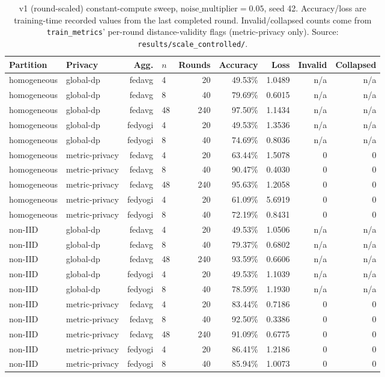 \documentclass[11pt]{article}
\newcommand{\code}[1]{\texttt{#1}}
\begin{document}
\begin{table}[h]
\centering
\footnotesize
\begin{tabular}{llrlrrrrr}
\toprule
Partition & Privacy & Agg. & $n$ & Rounds & Accuracy & Loss & Invalid & Collapsed \\
\midrule
homogeneous & global-dp      & fedavg  & 4  & 20  & 49.53\% & 1.0489 & n/a & n/a \\
homogeneous & global-dp      & fedavg  & 8  & 40  & 79.69\% & 0.6015 & n/a & n/a \\
homogeneous & global-dp      & fedavg  & 48 & 240 & 97.50\% & 1.1434 & n/a & n/a \\
homogeneous & global-dp      & fedyogi & 4  & 20  & 49.53\% & 1.3536 & n/a & n/a \\
homogeneous & global-dp      & fedyogi & 8  & 40  & 74.69\% & 0.8036 & n/a & n/a \\
homogeneous & metric-privacy & fedavg  & 4  & 20  & 63.44\% & 1.5078 & 0 & 0 \\
homogeneous & metric-privacy & fedavg  & 8  & 40  & 90.47\% & 0.4030 & 0 & 0 \\
homogeneous & metric-privacy & fedavg  & 48 & 240 & 95.63\% & 1.2058 & 0 & 0 \\
homogeneous & metric-privacy & fedyogi & 4  & 20  & 61.09\% & 5.6919 & 0 & 0 \\
homogeneous & metric-privacy & fedyogi & 8  & 40  & 72.19\% & 0.8431 & 0 & 0 \\
non-IID     & global-dp      & fedavg  & 4  & 20  & 49.53\% & 1.0506 & n/a & n/a \\
non-IID     & global-dp      & fedavg  & 8  & 40  & 79.37\% & 0.6802 & n/a & n/a \\
non-IID     & global-dp      & fedavg  & 48 & 240 & 93.59\% & 0.6606 & n/a & n/a \\
non-IID     & global-dp      & fedyogi & 4  & 20  & 49.53\% & 1.1039 & n/a & n/a \\
non-IID     & global-dp      & fedyogi & 8  & 40  & 78.59\% & 1.1930 & n/a & n/a \\
non-IID     & metric-privacy & fedavg  & 4  & 20  & 83.44\% & 0.7186 & 0 & 0 \\
non-IID     & metric-privacy & fedavg  & 8  & 40  & 92.50\% & 0.3386 & 0 & 0 \\
non-IID     & metric-privacy & fedavg  & 48 & 240 & 91.09\% & 0.6775 & 0 & 0 \\
non-IID     & metric-privacy & fedyogi & 4  & 20  & 86.41\% & 1.2186 & 0 & 0 \\
non-IID     & metric-privacy & fedyogi & 8  & 40  & 85.94\% & 1.0073 & 0 & 0 \\
\bottomrule
\end{tabular}
\caption{v1 (round-scaled) constant-compute sweep, $\text{noise\_multiplier}=0.05$, seed 42.
Accuracy/loss are training-time recorded values from the last completed round. Invalid/collapsed
counts come from \code{train\_metrics}' per-round distance-validity flags (metric-privacy only).
Source: \code{results/scale\_controlled/}.}
\label{tab:v1}
\end{table}
\end{document}
